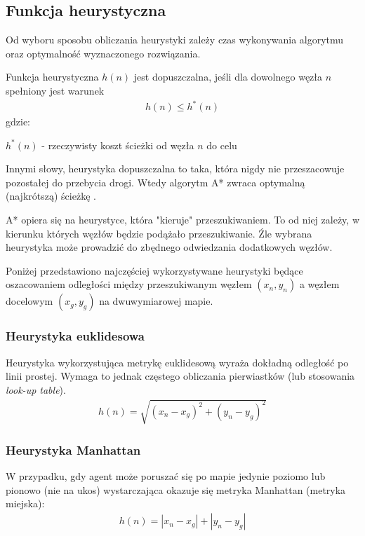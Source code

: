 \subsection{Funkcja heurystyczna}
\label{ch:astar_heurystyki}
Od wyboru sposobu obliczania heurystyki zależy czas wykonywania algorytmu oraz optymalność wyznaczonego rozwiązania.

Funkcja heurystyczna $h(n)$ jest dopuszczalna, jeśli dla dowolnego węzła $n$ spełniony jest warunek
\begin{gather}
 	h(n) \leq h^*(n)
 	\label{eq_astar_heurystyka_admissible} 
\end{gather}
 gdzie:

 $h^*(n)$ - rzeczywisty koszt ścieżki od węzła $n$ do celu

Innymi słowy, heurystyka dopuszczalna to taka, która nigdy nie przeszacowuje pozostałej do przebycia drogi. Wtedy algorytm A* zwraca optymalną (najkrótszą) ścieżkę \cite{cooppath}.

A* opiera się na heurystyce, która "kieruje" przeszukiwaniem.
To od niej zależy, w kierunku których węzłów będzie podążało przeszukiwanie.
Źle wybrana heurystyka może prowadzić do zbędnego odwiedzania dodatkowych węzłów.

Poniżej przedstawiono najczęściej wykorzystywane heurystyki będące oszacowaniem odległości między przeszukiwanym węzłem $(x_n, y_n)$ a węzłem docelowym $(x_g, y_g)$ na dwuwymiarowej mapie.

\subsubsection{Heurystyka euklidesowa}
Heurystyka wykorzystująca metrykę euklidesową wyraża dokładną odległość po linii prostej. Wymaga to jednak częstego obliczania pierwiastków (lub stosowania {\it look-up table}).
\begin{gather}
 	h(n) = \sqrt{(x_n - x_g)^2 + (y_n - y_g)^2}
 	\label{eq_astar_heu_euc} 
\end{gather}

\subsubsection{Heurystyka Manhattan}
W przypadku, gdy agent może poruszać się po mapie jedynie poziomo lub pionowo (nie na ukos) wystarczająca okazuje się metryka Manhattan (metryka miejska):
\begin{gather}
 	h(n) = |x_n - x_g| + |y_n - y_g|
 	\label{eq_astar_heu_man} 
\end{gather}

